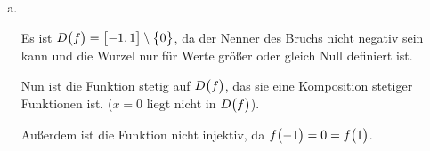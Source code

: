 \documentclass{scrreprt}
\begin{document}
\begin{enumerate}[(a)]
\item \phantom{\null} \\

  Es ist $D\qty\big(f) = \qty\big[-1, 1] \setminus \qty\big{0}$, da der
  Nenner des Bruchs nicht negativ sein kann und die Wurzel nur für Werte größer
  oder gleich Null definiert ist.

  Nun ist die Funktion stetig auf $D\qty\big(f)$, das sie eine Komposition
  stetiger Funktionen ist.
  ($x = 0$ liegt nicht in $D\qty\big(f)$).

  Außerdem ist die Funktion nicht injektiv, da
  $f\qty\big(-1) = 0 = f\qty\big(1)$.


\end{enumerate}
\end{document}
